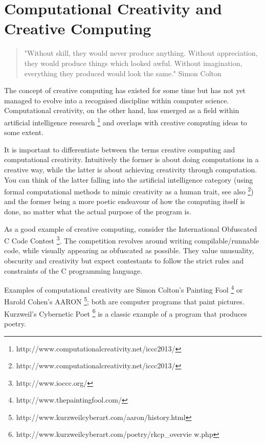 \section{Computational Creativity and Creative Computing}

\begin{quote}
  "Without skill, they would never produce anything. Without appreciation, they would produce things which looked awful. Without imagination, everything they produced would look the same." Simon Colton \citep{Colton2008}
\end{quote}


The concept of creative computing has existed for some time but has not yet managed to evolve into a recognised discipline within computer science. Computational creativity, on the other hand, has emerged as a field within artificial intelligence research \footnote{http://www.computationalcreativity.net/iccc2013/} and overlaps with creative computing ideas to some extent.

It is important to differentiate between the terms creative computing and computational creativity. Intuitively the former is about doing computations in a creative way, while the latter is about achieving creativity through computation. You can think of the latter falling into the artificial intelligence category (using formal computational methods to mimic creativity as a human trait, see also \footnote{http://www.computationalcreativity.net/iccc2013/}) and the former being a more poetic endeavour of how the computing itself is done, no matter what the actual purpose of the program is.

As a good example of creative computing, consider the International Obfuscated C Code Contest \footnote{http://www.ioccc.org/}. The competition revolves around writing compilable/runnable code, while visually appearing as obfuscated as possible. They value unusuality, obscurity and creativity but expect contestants to follow the strict rules and constraints of the C programming language.

Examples of computational creativity are Simon Colton's Painting Fool \footnote{http://www.thepaintingfool.com/} or Harold Cohen's AARON \footnote{http://www.kurzweilcyberart.com/aaron/history.html}; both are computer programs that paint pictures. Kurzweil's Cybernetic Poet \footnote{http://www.kurzweilcyberart.com/poetry/rkcp_overvie w.php } is a classic example of a program that produces poetry.

